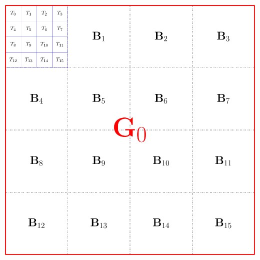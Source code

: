 \documentclass{beamer}
\begin{document}
\begin{frame}
\begin{columns}
\includegraphics[width=\textwidth]{../data/gpu/gputhreads.pdf}
\end{columns}
\end{frame}
\end{document}
